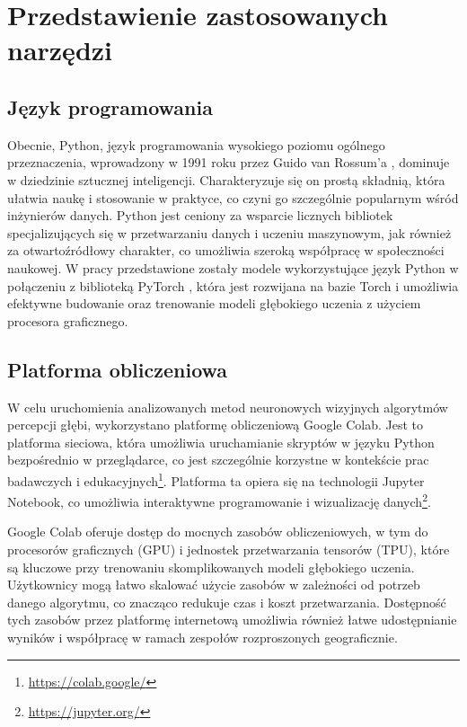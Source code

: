 \chapter{Przedstawienie zastosowanych narzędzi}\label{chap:przedstawienie_zastosowanych_narzędzi}

\section{Język programowania}
Obecnie, Python, język programowania wysokiego poziomu ogólnego przeznaczenia, wprowadzony w 1991 roku przez Guido van Rossum’a \cite{Python}, dominuje w dziedzinie sztucznej inteligencji. Charakteryzuje się on prostą składnią, która ułatwia naukę i stosowanie w praktyce, co czyni go szczególnie popularnym wśród inżynierów danych. Python jest ceniony za wsparcie licznych bibliotek specjalizujących się w przetwarzaniu danych i uczeniu maszynowym, jak również za otwartoźródłowy charakter, co umożliwia szeroką współpracę w społeczności naukowej. W pracy przedstawione zostały modele wykorzystujące język Python w połączeniu z biblioteką PyTorch \cite{paszke2019}, która jest rozwijana na bazie Torch i umożliwia efektywne budowanie oraz trenowanie modeli głębokiego uczenia z użyciem procesora graficznego.

\section{Platforma obliczeniowa}
W celu uruchomienia analizowanych metod neuronowych wizyjnych algorytmów percepcji głębi, wykorzystano platformę obliczeniową Google Colab. Jest to platforma sieciowa, która umożliwia uruchamianie skryptów w języku Python bezpośrednio w przeglądarce, co jest szczególnie korzystne w kontekście prac badawczych i edukacyjnych\footnote{\href{https://colab.google/}{https://colab.google/}}. Platforma ta opiera się na technologii Jupyter Notebook, co umożliwia interaktywne programowanie i wizualizację danych\footnote{\href{https://jupyter.org/}{https://jupyter.org/}}.

Google Colab oferuje dostęp do mocnych zasobów obliczeniowych, w tym do procesorów graficznych (GPU) i jednostek przetwarzania tensorów (TPU), które są kluczowe przy trenowaniu skomplikowanych modeli głębokiego uczenia. Użytkownicy mogą łatwo skalować użycie zasobów w zależności od potrzeb danego algorytmu, co znacząco redukuje czas i koszt przetwarzania. Dostępność tych zasobów przez platformę internetową umożliwia również łatwe udostępnianie wyników i współpracę w ramach zespołów rozproszonych geograficznie.

